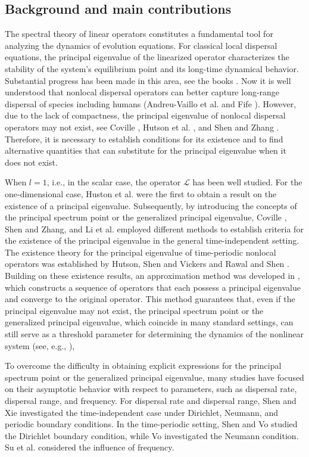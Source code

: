 \documentclass[11pt,reqno]{amsart}
\numberwithin{equation}{section}
\begin{document}
\subsection{Background and main contributions}
\indent

The spectral theory of linear operators constitutes a fundamental tool for analyzing the dynamics of evolution equations. For classical local dispersal equations, the principal eigenvalue of the linearized operator characterizes the stability of the system's equilibrium point and its long-time dynamical behavior.
Substantial progress has been made in this area, see the books \cite{CC2003,LL2022}.
Now it is well understood that nonlocal dispersal operators can better capture long-range
dispersal of species including humans (Andreu-Vaillo et al. \cite{AMRM} and Fife \cite{Fife}).
However, due to the lack of compactness, the principal
eigenvalue of nonlocal dispersal operators may not exist, see Coville \cite{Co10}, Hutson et al. \cite{HMMV03},
and Shen and Zhang \cite{SZ}.
Therefore, it is necessary to
establish conditions for its existence and to find alternative quantities that can substitute for the principal eigenvalue when it does not exist.


When $l=1$, i.e., in the scalar case, the operator $\mathcal{L}$ has been well studied.
For the one-dimensional case, Huston et al.\cite{HMMV03} were the first to obtain a result on the existence of a principal eigenvalue.
Subsequently, by introducing the concepts of the principal spectrum point or the generalized principal eigenvalue, Coville \cite{Co10}, Shen and Zhang\cite{SZ}, and Li et al. \cite{LCW} employed different methods to establish criteria for the existence of the principal eigenvalue in the general time-independent setting.
The existence theory for the principal eigenvalue of time-periodic nonlocal operators was established by Hutson, Shen and Vickers \cite{HSV08} and Rawal and Shen \cite{RS}.
Building on these existence results, an approximation method was developed in \cite{Co10, RS, SX1}, which constructs a sequence of operators that each possess a principal eigenvalue and converge to the original operator.
This method guarantees that, even if the principal eigenvalue may not exist, the principal spectrum point or the generalized principal eigenvalue, which coincide in many standard settings, can still serve as a threshold parameter for determining the dynamics of the nonlinear system
(see, e.g., \cite{BCV2,Co10,RS,ShenVo,SLLY}),


To overcome the difficulty in obtaining explicit expressions for the principal spectrum point or the generalized principal eigenvalue, many studies have focused on their asymptotic behavior with respect to parameters, such as dispersal rate, dispersal range, and
frequency.
For dispersal rate and dispersal range, Shen and Xie \cite{SX} investigated the time-independent case under  Dirichlet, Neumann, and periodic boundary conditions.
In the time-periodic setting, Shen and Vo \cite{ShenVo} studied the Dirichlet boundary condition, while Vo \cite{Vo1} investigated the Neumann condition. Su et al. \cite{SLLY} considered the influence of frequency.
\end{document}
